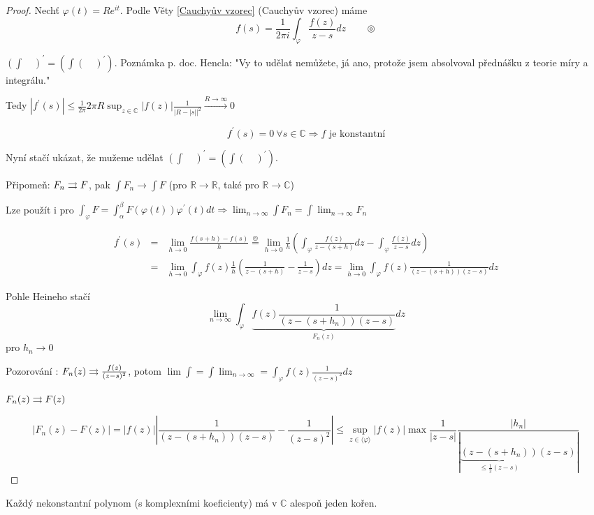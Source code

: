 \begin{proof}
Nechť $\varphi (t) = R e^{it}$. Podle Věty \ref{Cauchyův vzorec} (Cauchyův vzorec) máme
$$f(s) = \frac{1}{2 \pi i} \int_\varphi \frac{f(z)}{z-s}dz \qquad \circledcirc$$

$(\int \quad)^\prime = (\int (\quad)^\prime)$. Poznámka p. doc. Hencla: "Vy to udělat nemůžete, já ano, protože jsem absolvoval přednášku z teorie míry a integrálu."

Tedy $|f^\prime (s)| \leq \frac{1}{2 \pi} 2 \pi R \sup_{z \in \mathbb{C}} |f(z)| \frac{1}{| R - |s| |^2} \overset{R \to \infty}{\to} 0$

$$f^\prime (s) = 0 \ \forall s \in \mathbb{C} \Rightarrow \textrm{$f$ je konstantní}$$

Nyní stačí ukázat, že mužeme udělat $(\int \quad)^\prime = (\int (\quad)^\prime)$.

Připomeň: $F_n \rightrightarrows F$, pak $\int F_n \to \int F$ (pro $\mathbb{R} \to \mathbb{R}$, také pro $\mathbb{R} \to \mathbb{C}$)

Lze použít i pro $\int_\varphi F = \int_\alpha^\beta F(\varphi(t)) \varphi^\prime (t) dt \Rightarrow \lim_{n \to \infty} \int F_n = \int \lim_{n \to \infty} F_n$

\begin{eqnarray*}
f^\prime (s) & = & \lim_{h \to 0} \frac{f(s+h)-f(s)}{h} \overset{\circledcirc}{=} \lim_{h \to 0} \frac{1}{h} \left( \int_\varphi \frac{f(z)}{z-(s+h)} dz - \int_\varphi \frac{f(z)}{z-s} dz \right) \\
& = & \lim_{h \to 0} \int_\varphi f(z) \frac{1}{h} \left( \frac{1}{z-(s+h)} - \frac{1}{z-s} \right) dz = \lim_{h \to 0} \int_\varphi f(z) \frac{1}{(z-(s+h))(z-s)} dz
\end{eqnarray*}

Pohle Heineho stačí 
$$\lim_{n \to \infty} \int_\varphi \underbrace{f(z) \frac{1}{(z-(s+h_n))(z-s)}}_{F_n(z)} dz$$
pro $h_n \to 0$

Pozorování : $F_n(z) \rightrightarrows \frac{f(z)}{(z-s)^2}$, potom $\lim \int = \int \lim_{n \to \infty} = \int_\varphi f(z) \frac{1}{(z-s)^2} dz$

$F_n(z) \rightrightarrows F(z)$

$$|F_n(z)-F(z)| = |f(z)| \left| \frac{1}{(z-(s+h_n))(z-s)} - \frac{1}{(z-s)^2} \right| \leq \sup_{z \in \langle \varphi \rangle} |f(z)| \max \frac{1}{|z-s|} \frac{|h_n|}{|\underbrace{(z-(s+h_n))}_{\leq \frac{1}{2} (z-s)}(z-s)|}$$
\end{proof}


\begin{vetal}
Každý nekonstantní polynom (s komplexními koeficienty) má v $\mathbb{C}$ alespoň jeden kořen.
\end{vetal}

